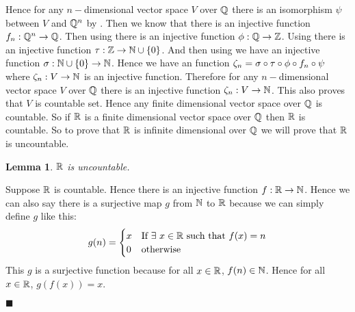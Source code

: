 \documentclass[a4paper, 11pt]{article}
\newtheorem{lemma}{Lemma}
\renewenvironment{proof}{\noindent{\it \textbf{Proof:}}\hspace*{1em}}{\hfill $\blacksquare$\bigskip\\}
\begin{document}
{\begin{itemize}
Hence for any $n-$dimensional vector space $V$ over $\mathbb{Q}$ there is an isomorphism $\psi$ between $V$ and $\mathbb{Q}^n$ by . Then we know that there is an injective function $f_n:\mathbb{Q}^n\to\mathbb{Q}$. Then using  there is an injective function $\phi:\mathbb{Q}\to \mathbb{Z}$. Using  there is an injective function $\tau:\mathbb{Z}\to\mathbb{N}\cup\{0\}$. And then using  we have an injective function $\sigma:\mathbb{N}\cup\{0\}\to \mathbb{N}$. Hence we have an  function $\zeta_n=\sigma\circ\tau\circ\phi\circ f_n\circ \psi$ where $\zeta_n:V\to \mathbb{N}$ is an injective function. Therefore for any $n-$dimensional vector space $V$ over $\mathbb{Q}$ there is an injective function $\zeta_n:V\to \mathbb{N}$. This also proves that $V$ is countable set. Hence any finite dimensional vector space over $\mathbb{Q}$  is countable. So if $\mathbb{R}$ is a finite dimensional vector space over $\mathbb{Q}$ then $\mathbb{R}$ is countable. So to prove that $\mathbb{R}$ is infinite dimensional over $\mathbb{Q}$ we will prove that $\mathbb{R}$ is uncountable.
\begin{lemma}
	$\mathbb{R}$ is uncountable.
\end{lemma}
\begin{proof}
	Suppose $\mathbb{R}$ is countable. Hence there is an injective function $f:\mathbb{R}\to\mathbb{N}$. Hence we can also say there is a surjective map $g$ from $\mathbb{N}$ to $\mathbb{R}$ because we can simply define $g$ like this: $$g(n)=\begin{cases}
		x& \text{If $\exists\ x\in\mathbb{R}$ such that $f(x)=n$}\\
		0 & \text{otherwise}
	\end{cases}$$This $g$ is a surjective function because for all $x\in\mathbb{R}$, $f(n)\in\mathbb{N}$. Hence for all $x\in \mathbb{R}$, $g(f(x))=x$. 


\end{proof}
\end{itemize}}
\end{document}
